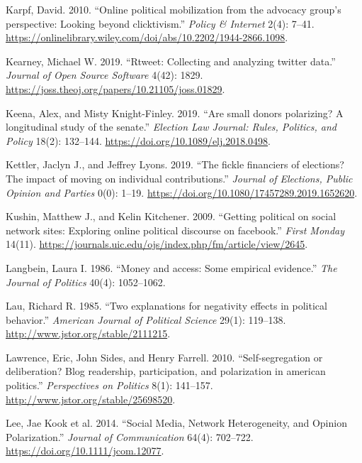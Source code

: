 \documentclass[12pt,]{article}
\begin{document}
\begin{CSLReferences}{1}{0}
\leavevmode{}%
Karpf, David. 2010. {``Online political mobilization from the advocacy
group's perspective: Looking beyond clicktivism.''} \emph{Policy \&
Internet} 2(4): 7--41.
\url{https://onlinelibrary.wiley.com/doi/abs/10.2202/1944-2866.1098}.

\leavevmode{}%
Kearney, Michael W. 2019. {``Rtweet: Collecting and analyzing twitter
data.''} \emph{Journal of Open Source Software} 4(42): 1829.
\url{https://joss.theoj.org/papers/10.21105/joss.01829}.

\leavevmode{}%
Keena, Alex, and Misty Knight-Finley. 2019. {``Are small donors
polarizing? A longitudinal study of the senate.''} \emph{Election Law
Journal: Rules, Politics, and Policy} 18(2): 132--144.
\url{https://doi.org/10.1089/elj.2018.0498}.

\leavevmode{}%
Kettler, Jaclyn J., and Jeffrey Lyons. 2019. {``The fickle financiers of
elections? The impact of moving on individual contributions.''}
\emph{Journal of Elections, Public Opinion and Parties} 0(0): 1--19.
\url{https://doi.org/10.1080/17457289.2019.1652620}.

\leavevmode{}%
Kushin, Matthew J., and Kelin Kitchener. 2009. {``Getting political on
social network sites: Exploring online political discourse on
facebook.''} \emph{First Monday} 14(11).
\url{https://journals.uic.edu/ojs/index.php/fm/article/view/2645}.

\leavevmode{}%
Langbein, Laura I. 1986. {``Money and access: Some empirical
evidence.''} \emph{The Journal of Politics} 40(4): 1052--1062.

\leavevmode{}%
Lau, Richard R. 1985. {``Two explanations for negativity effects in
political behavior.''} \emph{American Journal of Political Science}
29(1): 119--138. \url{http://www.jstor.org/stable/2111215}.

\leavevmode{}%
Lawrence, Eric, John Sides, and Henry Farrell. 2010. {``Self-segregation
or deliberation? Blog readership, participation, and polarization in
american politics.''} \emph{Perspectives on Politics} 8(1): 141--157.
\url{http://www.jstor.org/stable/25698520}.

\leavevmode{}%
Lee, Jae Kook et al. 2014. {``{Social Media, Network Heterogeneity, and
Opinion Polarization}.''} \emph{Journal of Communication} 64(4):
702--722. \url{https://doi.org/10.1111/jcom.12077}.


\end{CSLReferences}
\end{document}

